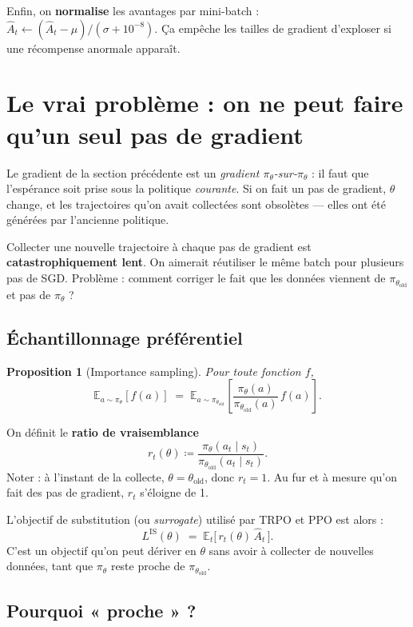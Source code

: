 \documentclass[a4paper,11pt]{article}
\theoremstyle{clean}
\newtheorem*{prop}{Proposition}
\newcommand{\E}{\mathbb{E}}
\newcommand{\piT}{\pi_{\theta}}
\newcommand{\piOld}{\pi_{\theta_{\text{old}}}}
\begin{document}
Enfin, on \textbf{normalise} les avantages par mini-batch : $\hat A_t \leftarrow (\hat A_t - \mu)/(\sigma + 10^{-8})$. Ça empêche les tailles de gradient d'exploser si une récompense anormale apparaît.

\section{Le vrai problème : on ne peut faire qu'un seul pas de gradient}

Le gradient de la section précédente est un \emph{gradient $\pi_\theta$-sur-$\pi_\theta$} : il faut que l'espérance soit prise sous la politique \emph{courante}. Si on fait un pas de gradient, $\theta$ change, et les trajectoires qu'on avait collectées sont obsolètes --- elles ont été générées par l'ancienne politique.

Collecter une nouvelle trajectoire à chaque pas de gradient est \textbf{catastrophiquement lent}. On aimerait réutiliser le même batch pour plusieurs pas de SGD. Problème : comment corriger le fait que les données viennent de $\piOld$ et pas de $\piT$ ?

\subsection{Échantillonnage préférentiel}

\begin{prop}[Importance sampling]
Pour toute fonction $f$,
\[
\E_{a\sim\piT}[f(a)] \;=\; \E_{a\sim\piOld}\!\left[\frac{\piT(a)}{\piOld(a)}\, f(a)\right].
\]
\end{prop}

On définit le \textbf{ratio de vraisemblance}
\[
r_t(\theta) \coloneqq \frac{\piT(a_t \mid s_t)}{\piOld(a_t \mid s_t)}.
\]
Noter : à l'instant de la collecte, $\theta = \theta_{\text{old}}$, donc $r_t = 1$. Au fur et à mesure qu'on fait des pas de gradient, $r_t$ s'éloigne de 1.

L'objectif de substitution (ou \emph{surrogate}) utilisé par TRPO et PPO est alors :
\[
L^{\mathrm{IS}}(\theta) \;=\; \E_t\!\big[\, r_t(\theta)\, \hat A_t \,\big].
\]
C'est un objectif qu'on peut dériver en $\theta$ sans avoir à collecter de nouvelles données, tant que $\piT$ reste proche de $\piOld$.

\subsection{Pourquoi « proche » ?}
\end{document}
